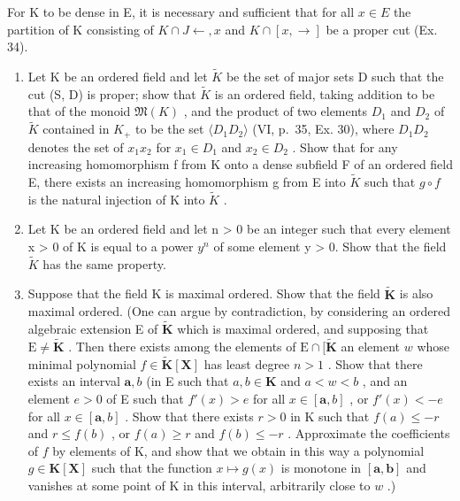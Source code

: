 For K to be dense in E, it is necessary and sufficient that for all \(x \in E\) the partition of K consisting of \(K \cap J \leftarrow, x\) and \(K \cap [x, \rightarrow]\) be a proper cut (Ex. 34).

\begin{enumerate}
\def\labelenumi{\arabic{enumi})}
\setcounter{enumi}{35}
\item
  Let K be an ordered field and let \(\tilde{K}\) be the set of major sets D such that the cut (S, D) is proper; show that \(\tilde{K}\) is an ordered field, taking addition to be that of the monoid \(\mathfrak{M}(K)\) , and the product of two elements \(D_{1}\) and \(D_{2}\) of \(\tilde{K}\) contained in \(K_{+}\) to be the set \(\langle D_{1}D_{2}\rangle\) (VI, p.~35, Ex. 30), where \(D_{1}D_{2}\) denotes the set of \(x_{1}x_{2}\) for \(x_{1}\in D_{1}\) and \(x_{2}\in D_{2}\) . Show that for any increasing homomorphism f from K onto a dense subfield F of an ordered field E, there exists an increasing homomorphism g from E into \(\tilde{K}\) such that \(g\circ f\) is the natural injection of K into \(\tilde{K}\) .
\item
  Let K be an ordered field and let n \textgreater{} 0 be an integer such that every element x \textgreater{} 0 of K is equal to a power \(y^{n}\) of some element y \textgreater{} 0. Show that the field \(\tilde{K}\) has the same property.
\item
  Suppose that the field K is maximal ordered. Show that the field \(\tilde{\mathbf{K}}\) is also maximal ordered. (One can argue by contradiction, by considering an ordered algebraic extension E of \(\tilde{\mathbf{K}}\) which is maximal ordered, and supposing that \(\mathrm{E} \neq \tilde{\mathbf{K}}\) . Then there exists among the elements of \(\mathrm{E} \cap [\tilde{\mathbf{K}}\) an element \(w\) whose minimal polynomial \(f \in \tilde{\mathbf{K}}[\mathbf{X}]\) has least degree \(n > 1\) . Show that there exists an interval \(\mathbf{a}, b\) (in E such that \(a, b \in \mathbf{K}\) and \(a < w < b\) , and an element \(e > 0\) of E such that \(f'(x) > e\) for all \(x \in [\mathbf{a}, b]\) , or \(f'(x) < -e\) for all \(x \in [\mathbf{a}, b]\) . Show that there exists \(r > 0\) in K such that \(f(a) \leqslant -r\) and \(r \leqslant f(b)\) , or \(f(a) \geqslant r\) and \(f(b) \leqslant -r\) . Approximate the coefficients of \(f\) by elements of K, and show that we obtain in this way a polynomial \(g \in \mathbf{K}[\mathbf{X}]\) such that the function \(x \mapsto g(x)\) is monotone in \([\mathbf{a}, \mathbf{b}]\) and vanishes at some point of K in this interval, arbitrarily close to \(w\) .)

\end{enumerate}
